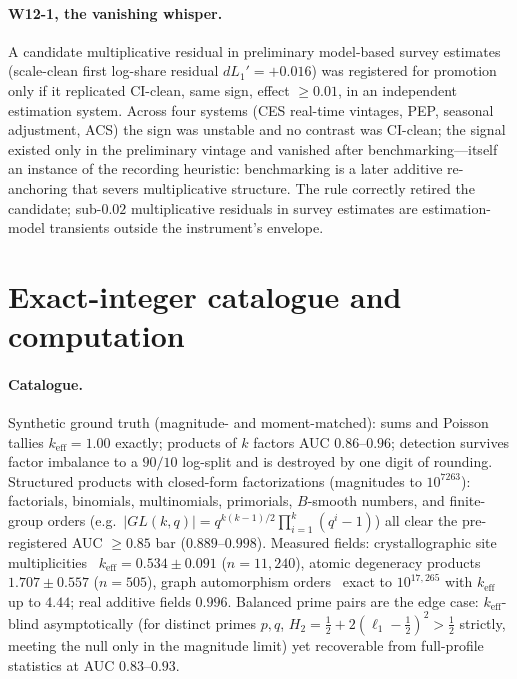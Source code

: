 \documentclass[12pt]{article}
\newcommand{\keff}{k_{\mathrm{eff}}}
\begin{document}
\paragraph{W12-1, the vanishing whisper.}
A candidate multiplicative residual in preliminary model-based survey
estimates (scale-clean first log-share residual $dL_1' = +0.016$) was registered for promotion only if it
replicated CI-clean, same sign, effect $\ge 0.01$, in an independent
estimation system. Across four systems (CES real-time vintages, PEP, seasonal
adjustment, ACS) the sign was unstable and no contrast was CI-clean; the
signal existed only in the preliminary vintage and vanished after
benchmarking---itself an instance of the recording heuristic: benchmarking is
a later additive re-anchoring that severs multiplicative structure. The rule
correctly retired the candidate; sub-$0.02$ multiplicative residuals in survey
estimates are estimation-model transients outside the instrument's envelope.

\section{Exact-integer catalogue and computation}
\label{s:exact}

\paragraph{Catalogue.}
Synthetic ground truth (magnitude- and moment-matched): sums and Poisson
tallies $\keff = 1.00$ exactly; products of $k$ factors AUC $0.86$--$0.96$;
detection survives factor imbalance to a $90/10$ log-split and is destroyed by
one digit of rounding. Structured products with closed-form factorizations
(magnitudes to $10^{7263}$): factorials, binomials, multinomials, primorials,
$B$-smooth numbers, and finite-group orders (e.g.\
$|GL(k,q)| = q^{k(k-1)/2} \prod_{i=1}^k (q^i - 1)$) all clear the
pre-registered AUC $\ge 0.85$ bar ($0.889$--$0.998$). Measured fields:
crystallographic site multiplicities~\citep{coddb} $\keff = 0.534 \pm 0.091$
($n = 11{,}240$), atomic degeneracy products~\citep{nistasd} $1.707 \pm 0.557$ ($n = 505$),
graph automorphism orders~\citep{snap} exact to $10^{17{,}265}$ with
$\keff$ up to $4.44$;
real additive fields $0.996$. Balanced prime pairs are the edge case:
$\keff$-blind asymptotically (for distinct primes $p, q$,
$H_2 = \tfrac12 + 2(\ell_1 - \tfrac12)^2 > \tfrac12$ strictly, meeting the
null only in the magnitude limit) yet recoverable from full-profile statistics
at AUC $0.83$--$0.93$.
\end{document}
